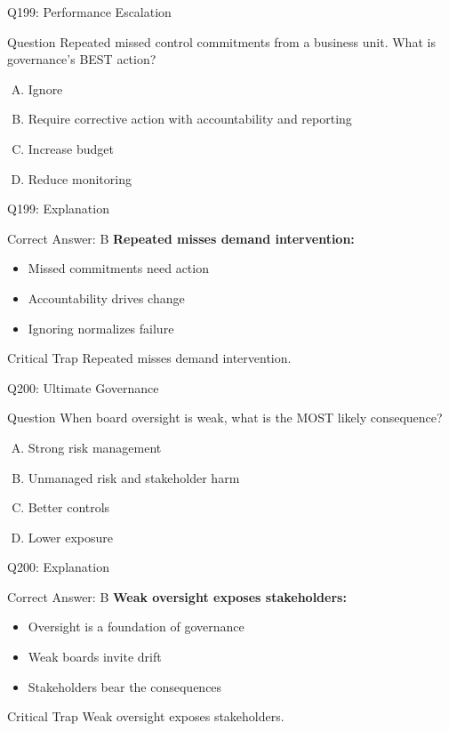 \documentclass{beamer}
\begin{document}
	\begin{frame}{Q199: Performance Escalation}
		\begin{block}{Question}
			Repeated missed control commitments from a business unit. What is governance's BEST action?
		\end{block}
		\begin{enumerate}[(A)]
			\item Ignore
			\item Require corrective action with accountability and reporting
			\item Increase budget
			\item Reduce monitoring
		\end{enumerate}
	\end{frame}
	
	\begin{frame}{Q199: Explanation}
		\begin{block}{Correct Answer: B}
			\textbf{Repeated misses demand intervention:}
			\begin{itemize}
				\item Missed commitments need action
				\item Accountability drives change
				\item Ignoring normalizes failure
			\end{itemize}
		\end{block}
		\begin{alertblock}{Critical Trap}
			Repeated misses demand intervention.
		\end{alertblock}
	\end{frame}
	
	\begin{frame}{Q200: Ultimate Governance}
		\begin{block}{Question}
			When board oversight is weak, what is the MOST likely consequence?
		\end{block}
		\begin{enumerate}[(A)]
			\item Strong risk management
			\item Unmanaged risk and stakeholder harm
			\item Better controls
			\item Lower exposure
		\end{enumerate}
	\end{frame}
	
	\begin{frame}{Q200: Explanation}
		\begin{block}{Correct Answer: B}
			\textbf{Weak oversight exposes stakeholders:}
			\begin{itemize}
				\item Oversight is a foundation of governance
				\item Weak boards invite drift
				\item Stakeholders bear the consequences
			\end{itemize}
		\end{block}
		\begin{alertblock}{Critical Trap}
			Weak oversight exposes stakeholders.
		\end{alertblock}
	\end{frame}
	
\end{document}
